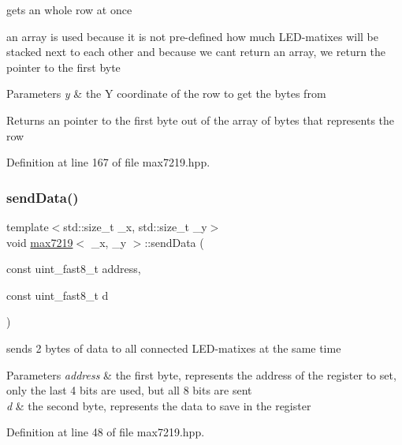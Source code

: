 gets an whole row at once 

an array is used because it is not pre-\/defined how much L\+E\+D-\/matixes will be stacked next to each other and because we can\textquotesingle{}t return an array, we return the pointer to the first byte 
\begin{DoxyParams}{Parameters}
{\em y} & the Y coordinate of the row to get the bytes from \\
\hline
\end{DoxyParams}
\begin{DoxyReturn}{Returns}
an pointer to the first byte out of the array of bytes that represents the row 
\end{DoxyReturn}


Definition at line 167 of file max7219.\+hpp.

\mbox{\label{classmax7219_a1a4ed4fb055b10180d4d35d9b3ccd764}} 
\subsubsection{\texorpdfstring{send\+Data()}{sendData()}}
{\footnotesize\ttfamily template$<$std\+::size\+\_\+t \+\_\+x, std\+::size\+\_\+t \+\_\+y$>$ \\
void \mbox{\hyperlink{classmax7219}{max7219}}$<$ \+\_\+x, \+\_\+y $>$\+::send\+Data (\begin{DoxyParamCaption}\item[{const uint\+\_\+fast8\+\_\+t}]{address,  }\item[{const uint\+\_\+fast8\+\_\+t}]{d }\end{DoxyParamCaption})\hspace{0.3cm}{\ttfamily [inline]}}



sends 2 bytes of data to all connected L\+E\+D-\/matixes at the same time 


\begin{DoxyParams}{Parameters}
{\em address} & the first byte, represents the address of the register to set, only the last 4 bits are used, but all 8 bits are sent \\
\hline
{\em d} & the second byte, represents the data to save in the register \\
\hline
\end{DoxyParams}


Definition at line 48 of file max7219.\+hpp.

